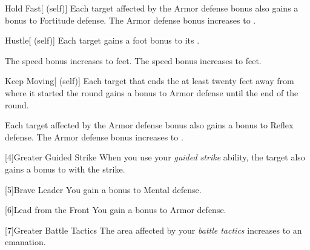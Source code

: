 {\begin{attuneability}{Hold Fast}[ (self)]
                \rankline
                 Each target affected by the Armor defense bonus also gains a  bonus to Fortitude defense.
                 The Armor defense bonus increases to .
            \end{attuneability}

            \begin{attuneability}{Hustle}[ (self)]
                Each target gains a  foot bonus to its .

                \rankline
                 The speed bonus increases to  feet.
                 The speed bonus increases to  feet.
            \end{attuneability}

            \begin{attuneability}{Keep Moving}[ (self)]
                Each target that ends the  at least twenty feet away from where it started the round gains a  bonus to Armor defense until the end of the round.

                \rankline
                 Each target affected by the Armor defense bonus also gains a  bonus to Reflex defense.
                 The Armor defense bonus increases to .
            \end{attuneability}
        }

        [4]{Greater Guided Strike} When you use your \textit{guided strike} ability, the target also gains a  bonus to  with the strike.

        [5]{Brave Leader} You gain a  bonus to Mental defense.

        [6]{Lead from the Front} You gain a  bonus to Armor defense.

        [7]{Greater Battle Tactics} The area affected by your \textit{battle tactics} increases to an \areahuge emanation.

\newpage
